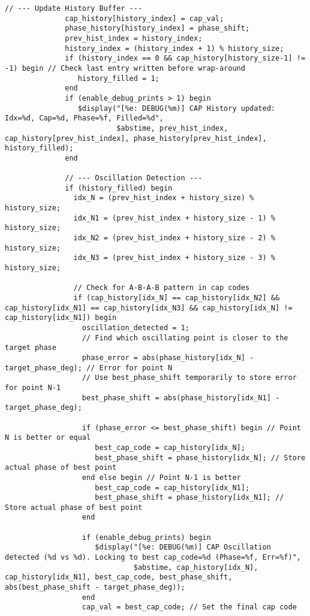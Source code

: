 \begin{lstlisting}[caption={Verilog-A Generic Capacitor Tuner Implementation}]
              // --- Update History Buffer ---
              cap_history[history_index] = cap_val;
              phase_history[history_index] = phase_shift;
              prev_hist_index = history_index;
              history_index = (history_index + 1) % history_size;
              if (history_index == 0 && cap_history[history_size-1] != -1) begin // Check last entry written before wrap-around
                 history_filled = 1;
              end
              if (enable_debug_prints > 1) begin
                 $display("[%e: DEBUG(%m)] CAP History updated: Idx=%d, Cap=%d, Phase=%f, Filled=%d",
                          $abstime, prev_hist_index, cap_history[prev_hist_index], phase_history[prev_hist_index], history_filled);
              end

              // --- Oscillation Detection ---
              if (history_filled) begin
                idx_N = (prev_hist_index + history_size) % history_size;
                idx_N1 = (prev_hist_index + history_size - 1) % history_size;
                idx_N2 = (prev_hist_index + history_size - 2) % history_size;
                idx_N3 = (prev_hist_index + history_size - 3) % history_size;

                // Check for A-B-A-B pattern in cap codes
                if (cap_history[idx_N] == cap_history[idx_N2] && cap_history[idx_N1] == cap_history[idx_N3] && cap_history[idx_N] != cap_history[idx_N1]) begin
                  oscillation_detected = 1;
                  // Find which oscillating point is closer to the target phase
                  phase_error = abs(phase_history[idx_N] - target_phase_deg); // Error for point N
                  // Use best_phase_shift temporarily to store error for point N-1
                  best_phase_shift = abs(phase_history[idx_N1] - target_phase_deg);

                  if (phase_error <= best_phase_shift) begin // Point N is better or equal
                     best_cap_code = cap_history[idx_N];
                     best_phase_shift = phase_history[idx_N]; // Store actual phase of best point
                  end else begin // Point N-1 is better
                     best_cap_code = cap_history[idx_N1];
                     best_phase_shift = phase_history[idx_N1]; // Store actual phase of best point
                  end

                  if (enable_debug_prints) begin
                     $display("[%e: DEBUG(%m)] CAP Oscillation detected (%d vs %d). Locking to best cap_code=%d (Phase=%f, Err=%f)",
                              $abstime, cap_history[idx_N], cap_history[idx_N1], best_cap_code, best_phase_shift, abs(best_phase_shift - target_phase_deg));
                  end
                  cap_val = best_cap_code; // Set the final cap code


\end{lstlisting}
